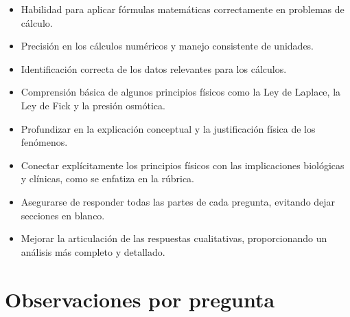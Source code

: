\documentclass[11pt,a4paper]{article}
\begin{document}
\vspace{4pt}
\begin{minipage}[t]{0.48\linewidth}
  \begin{tcolorbox}[cajaFortaleza, title={Fortalezas}]
\begin{itemize}[leftmargin=1.5em, itemsep=2pt]
  \item Habilidad para aplicar fórmulas matemáticas correctamente en problemas de cálculo.
  \item Precisión en los cálculos numéricos y manejo consistente de unidades.
  \item Identificación correcta de los datos relevantes para los cálculos.
  \item Comprensión básica de algunos principios físicos como la Ley de Laplace, la Ley de Fick y la presión osmótica.
\end{itemize}
  \end{tcolorbox}
\end{minipage}
\hfill
\begin{minipage}[t]{0.48\linewidth}
  \begin{tcolorbox}[cajaMejora, title={Areas de mejora}]
\begin{itemize}[leftmargin=1.5em, itemsep=2pt]
  \item Profundizar en la explicación conceptual y la justificación física de los fenómenos.
  \item Conectar explícitamente los principios físicos con las implicaciones biológicas y clínicas, como se enfatiza en la rúbrica.
  \item Asegurarse de responder todas las partes de cada pregunta, evitando dejar secciones en blanco.
  \item Mejorar la articulación de las respuestas cualitativas, proporcionando un análisis más completo y detallado.
\end{itemize}
  \end{tcolorbox}
\end{minipage}

\section*{Observaciones por pregunta}
\end{document}
